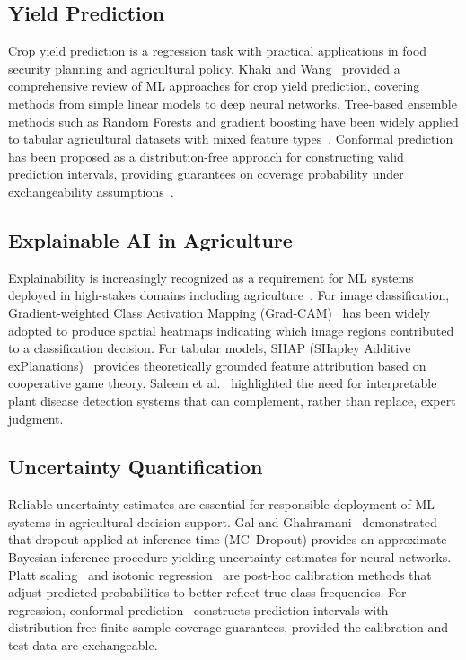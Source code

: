 \documentclass[conference]{IEEEtran}
\begin{document}
\subsection{Yield Prediction}

Crop yield prediction is a regression task with practical applications in food security planning and agricultural policy. Khaki and Wang~\cite{khaki2020comprehensive} provided a comprehensive review of ML approaches for crop yield prediction, covering methods from simple linear models to deep neural networks. Tree-based ensemble methods such as Random Forests and gradient boosting have been widely applied to tabular agricultural datasets with mixed feature types~\cite{jeong2016random}. Conformal prediction has been proposed as a distribution-free approach for constructing valid prediction intervals, providing guarantees on coverage probability under exchangeability assumptions~\cite{vovk2005algorithmic,shafer2008tutorial}.

\subsection{Explainable AI in Agriculture}

Explainability is increasingly recognized as a requirement for ML systems deployed in high-stakes domains including agriculture~\cite{arrieta2020explainable}. For image classification, Gradient-weighted Class Activation Mapping (Grad-CAM)~\cite{selvaraju2017grad} has been widely adopted to produce spatial heatmaps indicating which image regions contributed to a classification decision. For tabular models, SHAP (SHapley Additive exPlanations)~\cite{lundberg2017unified} provides theoretically grounded feature attribution based on cooperative game theory. Saleem et al.~\cite{saleem2019plant} highlighted the need for interpretable plant disease detection systems that can complement, rather than replace, expert judgment.

\subsection{Uncertainty Quantification}

Reliable uncertainty estimates are essential for responsible deployment of ML systems in agricultural decision support. Gal and Ghahramani~\cite{gal2016dropout} demonstrated that dropout applied at inference time (MC~Dropout) provides an approximate Bayesian inference procedure yielding uncertainty estimates for neural networks. Platt scaling~\cite{platt1999probabilistic} and isotonic regression~\cite{zadrozny2002transforming} are post-hoc calibration methods that adjust predicted probabilities to better reflect true class frequencies. For regression, conformal prediction~\cite{vovk2005algorithmic} constructs prediction intervals with distribution-free finite-sample coverage guarantees, provided the calibration and test data are exchangeable.
\end{document}
